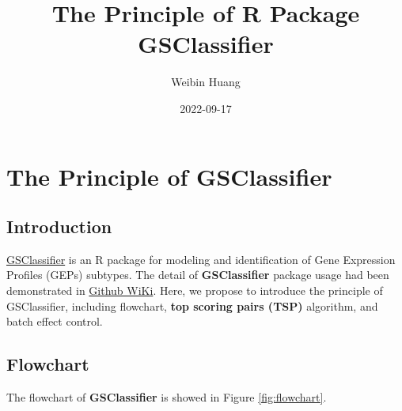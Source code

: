 \documentclass[
  12pt,
]{book}
\title{The Principle of R Package GSClassifier}
\author{Weibin Huang}
\date{2022-09-17}
\begin{document}
\maketitle

{
\hypersetup{linkcolor=}
\setcounter{tocdepth}{2}
\tableofcontents
}
\hypertarget{the-principle-of-gsclassifier}{%
\chapter{The Principle of GSClassifier}\label{the-principle-of-gsclassifier}}

\hypertarget{introduction}{%
\section{Introduction}\label{introduction}}

\href{https://github.com/huangwb8/GSClassifier}{GSClassifier} is an R package for modeling and identification of Gene Expression Profiles (GEPs) subtypes. The detail of \textbf{GSClassifier} package usage had been demonstrated in \href{https://github.com/huangwb8/GSClassifier/wiki}{Github WiKi}. Here, we propose to introduce the principle of GSClassifier, including flowchart, \textbf{top scoring pairs (TSP)} algorithm, and batch effect control.

\hypertarget{flowchart}{%
\section{Flowchart}\label{flowchart}}

The flowchart of \textbf{GSClassifier} is showed in Figure \ref{fig:flowchart}.
\end{document}
